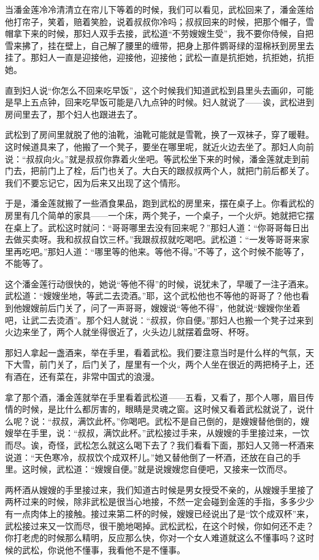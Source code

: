 \par 当潘金莲冷冷清清立在帘儿下等着的时候，我们可以看见，武松回来了，潘金莲给他打帘子，笑着，赔着笑脸，说着叔叔你冷吗；叔叔回来的时候，把那个帽子，雪帽拿下来的时候，那妇人双手去接，武松道“不劳嫂嫂生受”，我不要你侍候，自把雪来拂了，挂在壁上，自己解了腰里的缠带，把身上那件鹦哥绿的湿棉袄到房里去挂了。那妇人一直是迎接他，迎接他，迎接他；武松一直是抗拒她，抗拒她，抗拒她。
\par 直到妇人说“你怎么不回来吃早饭”，这个时候我们知道武松到县里头去画卯，可能是早上五点钟，回来吃早饭可能是八九点钟的时候。妇人就说了——诶，武松进到房间里去了，那个妇人也跟进去了。
\par 武松到了房间里就脱了他的油靴，油靴可能就是雪靴，换了一双袜子，穿了暖鞋。这时候道具来了，他搬了一个凳子，要坐在哪里呢，就近火边去坐了。那妇人向前说：“叔叔向火。”就是叔叔你靠着火坐吧。等武松坐下来的时候，潘金莲就走到前门去，把前门上了栓，后门也关了。大白天的跟叔叔两个人，就把门前后都关了。我们不要忘记它，因为后来又出现了这个情形。
\par 于是，潘金莲就搬了一些酒食果品，跑到武松的房里来，摆在桌子上。你看武松的房里有几个简单的家具——一个床，两个凳子，一个桌子，一个火炉。她就把它摆在桌上了。武松这时就问：“哥哥哪里去没有回来呢？”那妇人道：“你哥哥每日出去做买卖呀。我和叔叔自饮三杯。”我跟叔叔就吃喝吧。武松道：“一发等哥哥来家里再吃吧。”那妇人道：“哪里等的他来。等他不得。”不等了，这个时候不能等了，不能等了。
\par 这个潘金莲行动很快的，她说“等他不得”的时候，说犹未了，早暖了一注子酒来。武松道：“嫂嫂坐地，等武二去烫酒。”耶，这个武松他也不等他的哥哥了？他也看到他嫂嫂前后门关了，问了一声哥哥，嫂嫂说“等他不得”，他就说“嫂嫂你坐着吧，让武二去烫酒”。那个妇人就说：“叔叔，你自便。”那妇人也搬一个凳子过来到火边来坐了，两个人就坐得很近了，火头边儿就摆着盘呀、杯呀。
\par 那妇人拿起一盏酒来，举在手里，看着武松。我们要注意当时是什么样的气氛，天下大雪，前门关了，后门关了，屋里有一个火，两个人坐在很近的两把椅子上，还有酒在，还有菜在，非常中国式的浪漫。
\par 拿了那个酒，潘金莲就举在手里看着武松道——五看，又看了，那个人哪，眉目传情的时候，是比什么都厉害的，眼睛是灵魂之窗。这时候又看着武松就说了，说什么呢？说：“叔叔，满饮此杯。”你喝吧。武松不是自己倒的，是嫂嫂替他倒的，嫂嫂举在手里，说：“叔叔，满饮此杯。”武松接过手来，从嫂嫂的手里接过来，一饮而尽。诶，奇怪，武松怎么就这么喝下去了？我们看看下面，那妇人又筛一杯酒来说道：“天色寒冷，叔叔饮个成双杯儿。”她又替他倒了一杯酒，还放在自己的手里。这时候，武松道：“嫂嫂自便。”就是说嫂嫂您自便吧，又接来一饮而尽。
\par 两杯酒从嫂嫂的手里接过来，我们知道古时候是男女授受不亲的，从嫂嫂手里接了两杯过来的时候，除非武松是很当心地接，不然一定会碰到金莲的手指，多多少少有一点肉体上的接触。接过来第二杯的时候，嫂嫂已经说出了是“饮个成双杯”来，武松接过来又一饮而尽，很干脆地喝掉。武松武松，在这个时候，你如何还不走？你打老虎的时候那么精明，反应那么快，你对一个女人难道就这么不懂事吗？这时候的武松，你说他不懂事，我看他不是不懂事。
